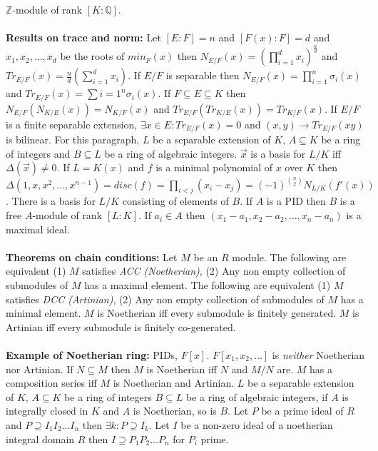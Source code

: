 ${\mathbb Z}$-module of rank $[K:{\mathbb Q}]$.
\\
\\
{\bf Results on trace and norm:}
Let $[E:F]=n$ and $[F(x):F]=d$ and $x_1 , x_2 , \ldots , x_d$ be the
roots of $min_F(x)$ then 
$N_{E/F}(x)= (\prod_{i=1}^d x_i)^{\frac n d}$ and
$Tr_{E/F}(x)= {\frac n d} (\sum_{i=1}^d x_i)$.  
If $E/F$ is separable then
$N_{E/F}(x)= \prod_{i=1}^n \sigma_i(x)$ and
$Tr_{E/F}(x)= \sum{i=1}^n \sigma_i(x)$.  If $F \subseteq E \subseteq K$ then
$N_{E/F}(N_{K/E}(x))= N_{K/F}(x)$ and $Tr_{E/F}(Tr_{K/E}(x))= Tr_{K/F}(x)$.  If
$E/F$ is a finite separable extension, $\exists x \in E: Tr_{E/F}(x)= 0$ and
$(x,y) \rightarrow Tr_{E/F}(xy)$ is bilinear.
For this paragraph, $L$ be a separable extension of $K$, 
$A \subseteq K$ be a ring of integers and
$B \subseteq L$ be a ring of algebraic integers.
${\vec x}$ is a basis for $L/K$ iff $\Delta({\vec x}) \ne 0$.  If
$L=K(x)$ and $f$ is a minimal polynomial of $x$ over $K$ then
$\Delta(1,x,x^2, \ldots, x^{n-1})= disc(f)= \prod_{i<j} (x_i-x_j)=
(-1)^{n \choose 2} N_{L/K}(f'(x))$.  There is a basis for $L/K$ consisting
of elements of $B$.  If $A$ is a PID then $B$ is a free $A$-module of rank $[L:K]$.
If $a_i \in A$ then $(x_1-a_1 , x_2 - a_2 , \ldots , x_n-a_n)$ is a maximal ideal.
\\
\\
{\bf Theorems on chain conditions:}
Let $M$ be an $R$ module.  
The following are equivalent
(1) $M$ satisfies \emph{ACC (Noetherian)}, 
(2) Any non empty collection of submodules of $M$
has a maximal element.
The following are equivalent
(1) $M$ satisfies \emph{DCC (Artinian)}, (2) Any non empty collection of submodules of $M$
has a minimal element.  
$M$ is Noetherian iff every submodule is finitely generated.
$M$ is Artinian iff every submodule is finitely co-generated.  
\\
\\
{\bf Example of Noetherian ring:}
PIDs, $F[x]$.  $F[x_1 ,x_2, \ldots ]$ is \emph{neither} Noetherian nor Artinian.
If $N \subseteq M$ then $M$ is Noetherian iff $N$ and $M/N$ are.  $M$ has a
composition series iff $M$ is Noetherian and Artinian.
$L$ be a separable extension of $K$, 
$A \subseteq K$ be a ring of integers
$B \subseteq L$ be a ring of algebraic integers, if $A$ is integrally closed
in $K$ and $A$ is Noetherian, so is $B$.
Let $P$ be a prime ideal of $R$ and 
$P \supseteq I_1 I_2 \ldots I_n$ then
$\exists k: P \supseteq I_k$.
Let $I$ be a non-zero ideal of a noetherian integral domain $R$ then
$I \supseteq P_1 P_2 \ldots P_n$ for $P_i$ prime.
